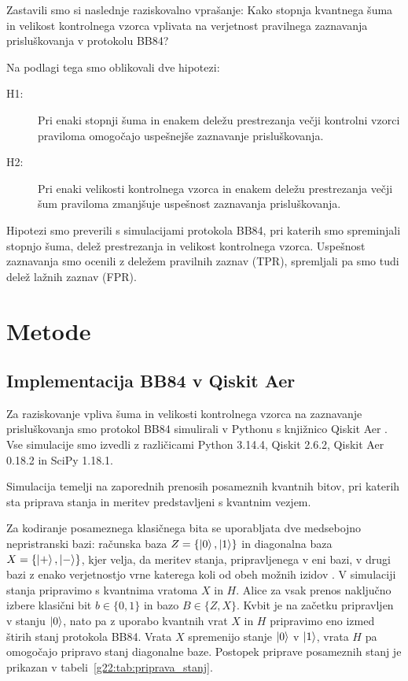 Zastavili smo si naslednje raziskovalno
vprašanje: Kako stopnja kvantnega šuma
in velikost kontrolnega vzorca vplivata
na verjetnost pravilnega zaznavanja
prisluškovanja v protokolu BB84?

Na podlagi tega smo oblikovali dve hipotezi:

\begin{description}
    \item[H1:] Pri enaki stopnji šuma in
    enakem deležu prestrezanja večji
    kontrolni vzorci praviloma omogočajo
    uspešnejše zaznavanje prisluškovanja.

    \item[H2:] Pri enaki velikosti
    kontrolnega vzorca in enakem deležu
    prestrezanja večji šum praviloma
    zmanjšuje uspešnost zaznavanja
    prisluškovanja.
\end{description}

Hipotezi smo preverili s simulacijami
protokola BB84, pri katerih smo spreminjali
stopnjo šuma, delež prestrezanja in
velikost kontrolnega vzorca. Uspešnost
zaznavanja smo ocenili z deležem
pravilnih zaznav (TPR), spremljali pa
smo tudi delež lažnih zaznav (FPR).



\section{Metode}
\label{g22:sec:metode}

\subsection{Implementacija BB84 v Qiskit Aer}
\label{g22:sec:orodja}


    Za raziskovanje vpliva šuma in velikosti
    kontrolnega vzorca na zaznavanje prisluškovanja
    smo protokol BB84 simulirali v Pythonu
    s knjižnico Qiskit Aer
    \cite{g22:aer-documentation}.
    Vse simulacije smo izvedli z različicami
    Python 3.14.4, Qiskit 2.6.2,
    Qiskit Aer 0.18.2 in SciPy 1.18.1.

    Simulacija temelji na zaporednih prenosih
    posameznih kvantnih bitov, pri katerih
    sta priprava stanja in meritev
    predstavljeni s kvantnim vezjem.

    Za kodiranje posameznega klasičnega bita se uporabljata dve medsebojno nepristranski bazi: računska baza \(Z=\{\ket{0},\ket{1}\}\) in diagonalna baza \(X=\{\ket{+},\ket{-}\}\), kjer velja,
    da meritev stanja, pripravljenega v eni bazi, v drugi bazi z enako verjetnostjo vrne katerega koli od obeh možnih izidov \cite{g22:mina2020scalable, g22:lee2023detection}.
    V simulaciji stanja pripravimo s kvantnima vratoma \(X\) in \(H\). 
    Alice za vsak prenos naključno izbere klasični bit $b \in \{0,1\}$ in bazo $B \in \{Z,X\}$. Kvbit je na začetku pripravljen v stanju $\ket{0}$,
    nato pa z uporabo kvantnih vrat $X$ in $H$ pripravimo eno izmed štirih stanj protokola BB84.
    Vrata $X$ spremenijo stanje $\ket{0}$ v $\ket{1}$, vrata $H$ pa omogočajo pripravo stanj diagonalne baze.
    Postopek priprave posameznih stanj je prikazan v tabeli~\ref{g22:tab:priprava_stanj}.

